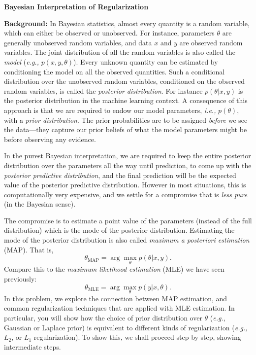 \item {} {\bf Bayesian Interpretation of Regularization}

\textbf{Background: }
In Bayesian statistics, almost every quantity is a random variable, which
can either be observed or unobserved. For instance, parameters $\theta$ are
generally unobserved random variables, and data $x$ and $y$ are observed
random variables. The joint distribution of all the random variables is
also called the \emph{model} (\emph{e.g.,} $p(x, y, \theta)$). Every unknown quantity can
be estimated by conditioning the model on all the observed quantities. Such
a conditional distribution over the unobserved random variables, conditioned
on the observed random variables, is called the \emph{posterior distribution}.
For instance $p(\theta | x, y)$ is the posterior distribution in the
machine learning context. A consequence of this approach is that we are
required to endow our model parameters, \emph{i.e.,} $p(\theta)$, with a \emph{prior distribution}.
The prior probabilities are to be assigned \emph{before} we see the data---they capture our prior beliefs of what the model parameters might be
before observing any evidence.

In the purest Bayesian interpretation, we are required to keep the entire
posterior distribution over the parameters all the way until prediction, to
come up with the \emph{posterior predictive distribution}, and the final prediction
will be the expected value of the posterior predictive distribution. However
in most situations, this is computationally very expensive, and we settle for
a compromise that is \emph{less pure} (in the Bayesian sense).

The compromise is to estimate a point value of the parameters (instead of the
full distribution) which is the mode of the posterior distribution. Estimating
the mode of the posterior distribution is also called
\emph{maximum a posteriori estimation} (MAP). That is,
$$\theta_{\text{MAP}} = \arg\max_\theta p(\theta|x,y).$$
Compare this to the \emph{maximum likelihood estimation} (MLE) we have
seen previously:
$$\theta_{\text{MLE}} = \arg\max_\theta p(y|x,\theta).$$
In this problem, we explore the connection between MAP estimation, and common
regularization techniques that are applied with MLE estimation.
In particular, you will show how the choice of prior distribution over $\theta$ (\emph{e.g.,}
Gaussian or Laplace prior)
is equivalent to different kinds of regularization (\emph{e.g.,} $L_2$, or $L_1$
regularization). To show this, we shall proceed step by step, showing intermediate
steps.

